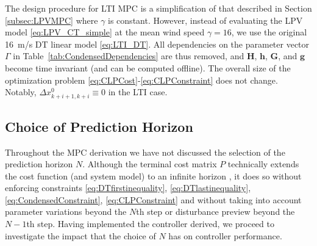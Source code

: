 \documentclass[letterpaper, 10 pt, conference]{ieeeconf}  %
\begin{document}
The design procedure for LTI MPC is a simplification of that described in Section \ref{subsec:LPVMPC} where $\gamma$ is constant. However, instead of evaluating the LPV model \eqref{eq:LPV_CT_simple} at the mean wind speed $\gamma = 16$, we use the original 16~m/s DT linear model \eqref{eq:LTI_DT}. All dependencies on the parameter vector $\Gamma$ in Table~\ref{tab:CondensedDependencies} are thus removed, and $\mathbf{H}$, $\mathbf{h}$, $\mathbf{G}$, and $\mathbf{g}$ become time invariant (and can be computed offline). The overall size of the optimization problem \eqref{eq:CLPCost}-\eqref{eq:CLPConstraint} does not change. Notably, $\Delta x^0_{k+i+1,k+i} \equiv 0$ in the LTI case.

\subsection{Choice of Prediction Horizon}
Throughout the MPC derivation we have not discussed the selection of the prediction horizon $N$. Although the terminal cost matrix $P$ technically extends the cost function (and system model) to an infinite horizon \cite{Rawlings2000}, it does so without enforcing constraints \eqref{eq:DTfirstinequality}, \eqref{eq:DTlastinequality}, \eqref{eq:CondensedConstraint}, \eqref{eq:CLPConstraint} and without taking into account parameter variations beyond the $N$th step or disturbance preview beyond the $N-1$th step. Having implemented the controller derived, we proceed to investigate the impact that the choice of $N$ has on controller performance.
\end{document}
